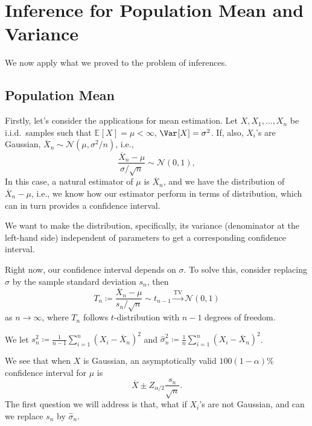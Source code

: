 \section{Inference for Population Mean and Variance}
We now apply what we proved to the problem of inferences.

\subsection{Population Mean}
Firstly, let's consider the applications for mean estimation. Let \(X, X_1, \dots , X_n\) be i.i.d.\ samples such that \(\mathbb{E}_{}[X] = \mu < \infty \), \(\Var_{}[X] = \sigma ^2\). If, also, \(X_i\)'s are Gaussian, \(\overline{X} _n \sim \mathcal{N} (\mu , \sigma ^2 / n)\), i.e.,
\[
	\frac{\overline{X} _n - \mu }{\sigma / \sqrt{n} } \sim \mathcal{N} (0, 1),
\]
In this case, a natural estimator of \(\mu \) is \(\overline{X} _n\), and we have the distribution of \(\overline{X} _n - \mu \), i.e., we know how our estimator perform in terms of distribution, which can in turn provides a confidence interval.

\begin{intuition}
	We want to make the distribution, specifically, its variance (denominator at the left-hand side) independent of parameters to get a corresponding confidence interval.
\end{intuition}

Right now, our confidence interval depends on \(\sigma \). To solve this, consider replacing \(\sigma \) by the sample standard deviation \(s_n\), then
\[
	T_n \coloneqq \frac{\overline{X} _n - \mu }{s_n / \sqrt{n} } \sim t_{n-1} \overset{\operatorname{TV}}{\to } \mathcal{N} (0, 1)
\]
as \(n \to \infty \), where \(T_n\) follows \(t\)-distribution with \(n-1\) degrees of freedom.

\begin{notation}
	We let \(s_n^2 \coloneqq \frac{1}{n-1} \sum_{i=1}^{n} (X_i - \overline{X} _n)^2\) and \(\hat{\sigma} _n^2 \coloneqq \frac{1}{n} \sum_{i=1}^{n} (X_i - \overline{X} _n)^2\).
\end{notation}

We see that when \(X\) is Gaussian, an asymptotically valid \(100 (1 - \alpha )\%\) confidence interval for \(\mu \) is
\[
	\overline{X} \pm Z_{\alpha / 2} \frac{s_n}{\sqrt{n} }.
\]
The first question we will address is that, what if \(X_i\)'s are not Gaussian, and can we replace \(s_n\) by \(\hat{\sigma} _n\).

